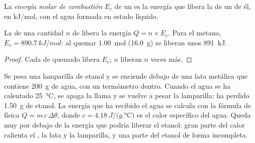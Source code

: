 \begin{definition}\label{def:g11:reaction-energy:combustion-energy}
La \emph{energía molar de combustión}
$E_c$ de un  es la energía que libera la 
de un  de él, en \si{kJ/mol}, con el agua formada en estado líquido.
\end{definition}

\begin{proposition}\label{prop:g11:reaction-energy:n-moles}
La  de una cantidad $n$ de  libera la
energía $Q = n \times E_c$. Para el metano, $E_c = \qty{890.7}{kJ/mol}$:
al quemar \qty{1.00}{mol} (\qty{16.0}{g}) se liberan unos
\qty{891}{kJ}.
\end{proposition}

\begin{proof}
Cada  de  quemado libera $E_c$; $n$  liberan $n$
veces más.
\end{proof}

\begin{inthelab}
Se pesa una lamparilla de etanol y se enciende debajo de una lata
metálica que contiene \qty{200}{g} de agua, con un termómetro dentro.
Cuando el agua se ha calentado \qty{25}{\celsius}, se apaga la llama y
se vuelve a pesar la lamparilla: ha perdido \qty{1.50}{g} de etanol. La
energía que ha recibido el agua se calcula con la fórmula de física
$Q = m\, c\, \Delta\theta$, donde $c = \qty{4.18}{J/(g.\celsius)}$ es el
calor específico del agua. Queda muy por debajo de la energía que podría
liberar el etanol: gran parte del calor calienta el , la lata y la
lamparilla, y una parte del etanol  de forma incompleta.
\end{inthelab}

